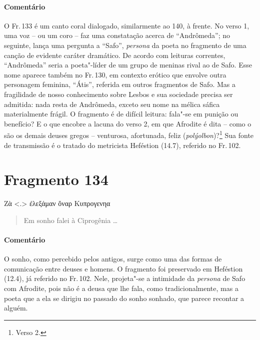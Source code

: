 \medskip

{\paragraph{Comentário} O Fr.\,133 é um canto coral dialogado, similarmente ao 140, à frente. No verso 1, uma voz -- ou um coro -- faz uma constatação acerca de ``Andrômeda''; no seguinte,
lança uma pergunta a ``Safo'', \textit{persona }da poeta no fragmento de
uma canção de evidente caráter dramático. De acordo com leituras correntes,
``Andrômeda'' seria a poeta"-líder de um grupo de
meninas rival ao de Safo. Esse nome aparece também no Fr.\,130, em contexto
erótico que envolve outra personagem feminina, ``Átis'', referida em
outros fragmentos de Safo. Mas a fragilidade de nosso conhecimento sobre Lesbos
e sua sociedade precisa ser admitida: nada resta de Andrômeda, exceto seu nome
na mélica sáfica materialmente frágil. O fragmento é de difícil leitura:
fala"-se em punição ou benefício? E o que encobre a lacuna do verso 2, em que
Afrodite é dita -- como o são os demais deuses gregos -- venturosa, afortunada, 
feliz (\textit{polýolbon})?\footnote{Verso 2.} Sua fonte de transmissão é o tratado do metricista Heféstion (14.7), referido
no Fr.\,102.}

\pagebreak

\section{Fragmento 134}

\begin{gkverse}
Ζὰ <.> ἐλεξάμαν ὄναρ Κυπρογενηα
\end{gkverse}

\begin{verse}
Em sonho falei à Ciprogênia \ldots{}
\end{verse}

\medskip

{\paragraph{Comentário} O sonho, como percebido pelos antigos, surge como uma das formas de 
comunicação entre deuses e homens. O fragmento foi preservado em Heféstion (12.4), já
referido no Fr.\,102. Nele, projeta"-se a intimidade da \textit{persona} de Safo com Afrodite, pois não é a deusa que lhe fala, como tradicionalmente, mas a poeta que a ela se dirigiu no passado do sonho sonhado, que parece recontar a alguém.}


